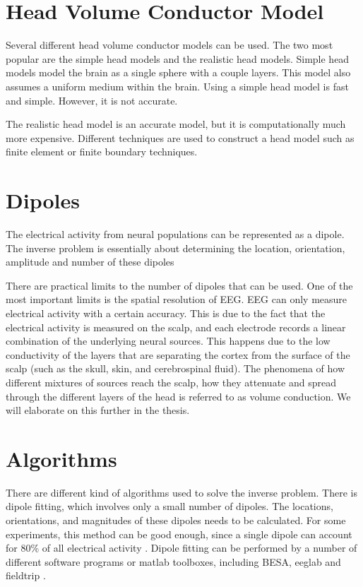 \section{Head Volume Conductor Model}

Several different head volume conductor models can be used. The two most popular are the simple head models and the realistic head models. Simple head models model the brain as a single sphere with a couple layers. This model also assumes a uniform medium within the brain. Using a simple head model is fast and simple. However, it is not accurate. 

The realistic head model is an accurate model, but it is computationally much more expensive. Different techniques are used to construct a head model such as finite element or finite boundary techniques. 

\section{Dipoles}

The electrical activity from neural populations can be represented as a dipole. The inverse problem is essentially about determining the location, orientation, amplitude and number of these dipoles

There are practical limits to the number of dipoles that can be used. One of the most important limits is the spatial resolution of EEG. EEG can only measure electrical activity with a certain accuracy. This is due to the fact that the electrical activity is measured on the scalp, and each electrode records a linear combination of the underlying neural sources. This happens due to the low conductivity of the layers that are separating the cortex from the surface of the scalp (such as the skull, skin, and cerebrospinal fluid). The phenomena of how different mixtures of sources reach the scalp, how they attenuate and spread through the different layers of the head is referred to as volume conduction. We will elaborate on this further in the thesis.

\section{Algorithms}\label{source-alg}

There are different kind of algorithms used to solve the inverse problem. There is dipole fitting, which involves only a small number of dipoles. The locations, orientations, and magnitudes of these dipoles needs to be calculated. For some experiments, this method can be good enough, since a single dipole can account for 80\% of all electrical activity \cite{cohen2014analyzing}. Dipole fitting can be performed by a number of different software programs or matlab toolboxes, including BESA, eeglab and fieldtrip \cite{hoechstetter2004besa, delorme2004eeglab, oostenveld2011fieldtrip}.

